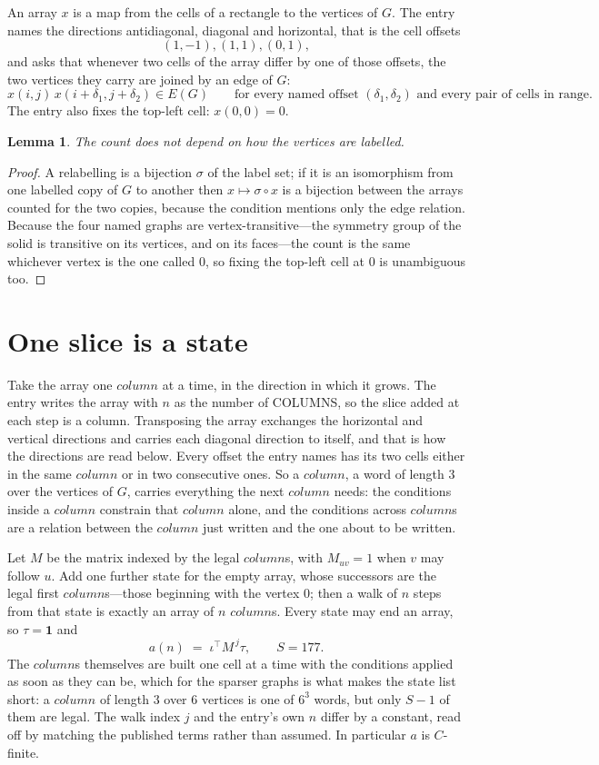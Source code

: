 \documentclass[11pt,a4paper]{article}
\theoremstyle{plain}
\newtheorem{lemma}[theorem]{Lemma}
\theoremstyle{definition}
\begin{document}
An array $x$ is a map from the cells of a rectangle to the vertices of $G$. The entry names the
directions antidiagonal, diagonal and horizontal, that is the cell offsets
\[
(1,-1), (1,1), (0,1),
\]
and asks that whenever two cells of the array differ by one of those offsets, the two vertices
they carry are joined by an edge of $G$:
\[
x(i,j)\,x(i+\delta_1,j+\delta_2)\in E(G)\qquad
\text{for every named offset } (\delta_1,\delta_2)\text{ and every pair of cells in range.}
\]
The entry also fixes the top-left cell: $x(0,0)=0$.

\begin{lemma}\label{lem:label}
The count does not depend on how the vertices are labelled.
\end{lemma}

\begin{proof}
A relabelling is a bijection $\sigma$ of the label set; if it is an isomorphism from one
labelled copy of $G$ to another then $x\mapsto\sigma\circ x$ is a bijection between the arrays
counted for the two copies, because the condition mentions only the edge relation.
Because the four named graphs are vertex-transitive---the symmetry group of the solid is transitive on its vertices, and on its faces---the count is the same whichever vertex is the one called $0$, so fixing the top-left cell at $0$ is unambiguous too.
\end{proof}

\section{One slice is a state}

Take the array one $column$ at a time, in the direction in which it grows. The entry writes the array with $n$ as the number of COLUMNS, so the slice added at each step is a column. Transposing the array exchanges the horizontal and vertical directions and carries each diagonal direction to itself, and that is how the directions are read below.
Every offset the entry names has its two cells either in the same $column$ or in two
consecutive ones. So a $column$, a word of length $3$ over the vertices of $G$, carries
everything the next $column$ needs: the conditions inside a $column$ constrain that
$column$ alone, and the conditions across $column$s are a relation between the
$column$ just written and the one about to be written.

Let $M$ be the matrix indexed by the legal $column$s, with $M_{uv}=1$ when $v$ may
follow $u$. Add one further state for the empty array, whose successors are the legal first
$column$s---those beginning with the vertex $0$; then a walk of
$n$ steps from that state is exactly an array of $n$ $column$s. Every state may end an
array, so $\tau=\mathbf{1}$ and
\[
a(n)\;=\;\iota^{\!\top}M^{\,j}\tau ,\qquad S=177.
\]
The $column$s themselves are built one cell at a time with the conditions applied as soon
as they can be, which for the sparser graphs is what makes the state list short: a $column$
of length $3$ over $6$ vertices is one of $6^{3}$ words, but only $S-1$ of them are
legal. The walk index $j$ and the entry's own $n$ differ by a constant, read off by matching the
published terms rather than assumed. In particular $a$ is $C$-finite.
\end{document}
